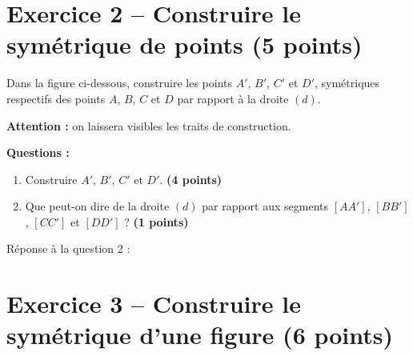 \documentclass[11pt,a4paper]{article}
\newcommand{\points}[1]{\hfill \textbf{(#1 points)}}
\begin{document}
\section*{Exercice 2 -- Construire le symétrique de points \points{5}}

Dans la figure ci-dessous, construire les points $A'$, $B'$, $C'$ et $D'$, symétriques respectifs des points $A$, $B$, $C$ et $D$ par rapport à la droite $(d)$.

\medskip

\textbf{Attention :} on laissera visibles les traits de construction.

\begin{center}
\end{center}

\textbf{Questions :}

\begin{enumerate}[label=\arabic*)]
    \item Construire $A'$, $B'$, $C'$ et $D'$. \points{4}
    \item Que peut-on dire de la droite $(d)$ par rapport aux segments $[AA']$, $[BB']$, $[CC']$ et $[DD']$ ? \points{1}
\end{enumerate}

\vspace{1cm}

Réponse à la question 2 :

\dotfill

\dotfill

\section*{Exercice 3 -- Construire le symétrique d'une figure \points{6}}
\end{document}
